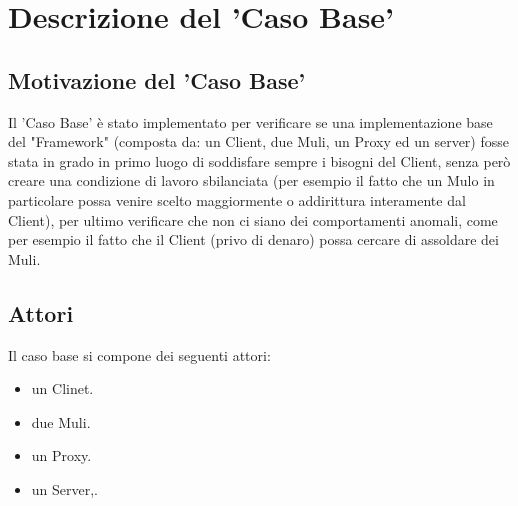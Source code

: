 \documentclass[13pt,a4paper]{article}
\begin{document}
	
	\section{Descrizione del 'Caso Base'}
	\subsection{Motivazione del 'Caso Base'} 
	Il 'Caso Base' è stato implementato per verificare se una implementazione base del "Framework" (composta da: un Client, due Muli, un Proxy ed un server) fosse stata in grado in primo luogo di soddisfare sempre i bisogni del Client, senza però creare una condizione di lavoro sbilanciata (per esempio il fatto che un Mulo in particolare possa venire scelto maggiormente o addirittura interamente dal Client), per ultimo verificare che non ci siano dei comportamenti anomali, come per esempio il fatto che il Client (privo di denaro) possa cercare di assoldare dei Muli.
	\subsection{Attori}
	Il caso base si compone dei seguenti attori: 
	\begin{itemize}
		\item un Clinet.
		\item due Muli.
		\item un Proxy.
		\item un Server,.
	\end{itemize}
	
\end{document}

